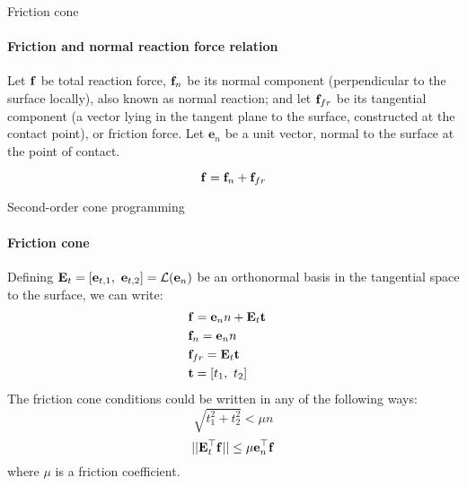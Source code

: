 \documentclass{beamer}
\begin{document}
\begin{frame}{Friction cone}
\framesubtitle{Friction and normal reaction force relation}
\begin{flushleft}

\begin{figure}
    \centering
    
    \label{fig:contact}
\end{figure}

Let $\mathbf{f}$ be total reaction force, $\mathbf{f}_n$ be its normal component (perpendicular to the surface locally), also known as normal reaction; and let $\mathbf{f}_{fr}$ be its tangential component (a vector lying in the tangent plane to the surface, constructed at the contact point), or friction force. Let $\mathbf{e}_n$ be a unit vector, normal to the surface at the point of contact.

\begin{equation}
    \mathbf{f} =  \mathbf{f}_n + \mathbf{f}_{fr}
\end{equation}

\end{flushleft}
\end{frame}



\begin{frame}{Second-order cone programming}
\framesubtitle{Friction cone}
\begin{flushleft}

Defining $\bo{E}_t = [\mathbf{e}_{t, 1}, \ \mathbf{e}_{t, 2}] = \mathcal{L}(\mathbf{e}_n)$ be an orthonormal basis in the tangential space to the surface, we can write:
%
\begin{align*}
\label{friction_cone}
    & \mathbf{f} = \mathbf{e}_n n + \mathbf{E}_t \mathbf{t} & \\
    & \mathbf{f}_n = \mathbf{e}_n n & \\
    & \mathbf{f}_{fr} = \mathbf{E}_t \mathbf{t} & \\
    & \mathbf{t} = [t_1, \ t_2]
\end{align*}
%
The friction cone conditions could be written in any of the following ways:
%
\begin{equation}
\label{friction_cone}
    \sqrt{t_1^2 + t_2^2} < \mu n
\end{equation}
%
\begin{equation}
    || \mathbf{E}_t^\top \mathbf{f} || \leq \mu \mathbf{e}_n^\top \mathbf{f}
\end{equation}
%
where $\mu$ is a friction coefficient.
 
\end{flushleft}
\end{frame}
\end{document}
